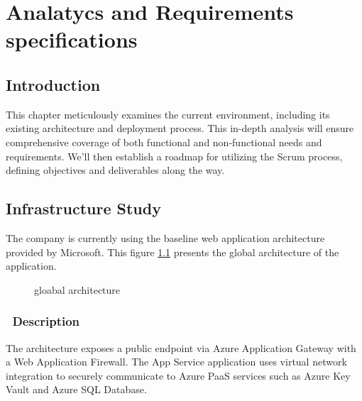 \chapter{Analatycs and Requirements specifications}

\section*{Introduction}
This chapter meticulously examines the current environment, including its existing architecture and deployment process. This in-depth analysis will ensure comprehensive coverage of both functional and non-functional needs and requirements. We'll then establish a roadmap for utilizing the Scrum process, defining objectives and deliverables along the way.

\section{Infrastructure Study}
The company is currently using the baseline web application architecture provided by Microsoft\cite{baseline}.
This figure \ref{fig:gloabal_architecture} presents the global architecture of the application.

\begin{figure}[H]
    \centering
    \caption{gloabal architecture}
    \label{fig:gloabal_architecture}
\end{figure}

\pagebreak

\subsection*{\textbullet\ Description}
The architecture exposes a public endpoint via Azure Application Gateway with a Web Application Firewall. The App Service application uses virtual network integration to securely communicate to Azure PaaS services such as Azure Key Vault and Azure SQL Database.

